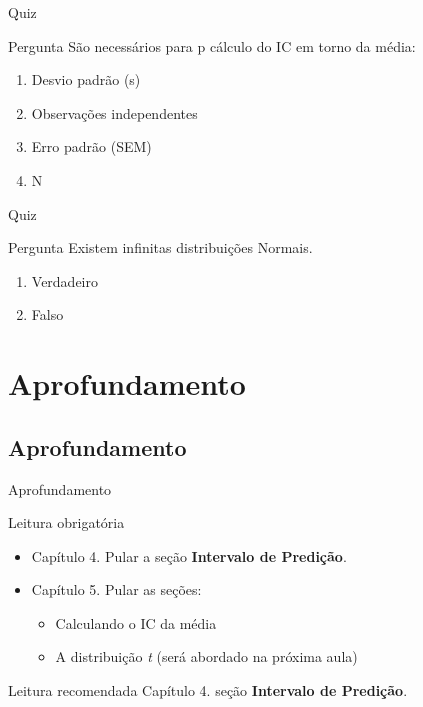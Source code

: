 \documentclass{beamer}
\begin{document}
\begin{frame}{\scriptsize Quiz}
  \begin{block}{Pergunta}
    \footnotesize
    São necessários para p cálculo do IC em torno da média:

    \bigskip
    \begin{enumerate}
      \scriptsize
    \item \alert<2>{Desvio padrão (s)}
    \item \alert<2>{Observações independentes}
    \item \alert<2>{Erro padrão (SEM)}
    \item \alert<2>{N}
    \end{enumerate}
  \end{block}
\end{frame}

\begin{frame}{\scriptsize Quiz}
  \begin{block}{Pergunta}
    \footnotesize
    Existem infinitas distribuições Normais.

    \bigskip
    \begin{enumerate}
      \scriptsize
    \item \alert<2>{Verdadeiro}
    \item Falso
    \end{enumerate}
  \end{block}
\end{frame}


\section{Aprofundamento}

\subsection{Aprofundamento}

\begin{frame}{\scriptsize Aprofundamento}
  \begin{block}{Leitura obrigatória}
    \begin{itemize}
      \footnotesize
    \item Capítulo 4. Pular a seção {\bf Intervalo de Predição}.
    \item Capítulo 5. Pular as seções:
      \begin{itemize}
        \scriptsize
      \item Calculando o IC da média
      \item A distribuição {\em t} ({\tiny será abordado na próxima aula})
      \end{itemize}
    \end{itemize}
  \end{block}
  \begin{block}{Leitura recomendada}
    \scriptsize
    Capítulo 4. seção {\bf Intervalo de Predição}.
  \end{block}
\end{frame}
\end{document}
